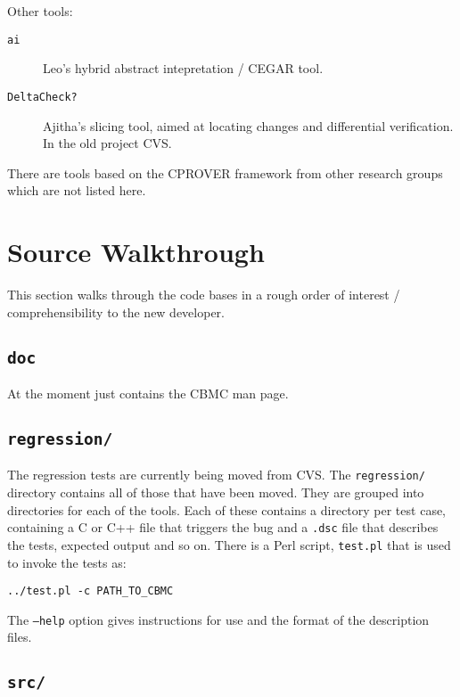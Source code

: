 \documentclass{article}
\newcommand{\dir}[1]{\texttt{#1}}
\newcommand{\file}[1]{\texttt{#1}}
\newcommand{\code}[1]{\texttt{#1}}
\newcommand{\prog}[1]{\texttt{#1}}
\begin{document}
Other tools:

\begin{description}
  \item[\prog{ai}]{Leo's hybrid abstract intepretation / CEGAR tool.}

  \item[\prog{DeltaCheck?}]{Ajitha's slicing tool, aimed at locating
    changes and differential verification.  In the old project CVS.}
\end{description}


There are tools based on the CPROVER framework from other research
groups which are not listed here.






\section{Source Walkthrough}

This section walks through the code bases in a rough order of interest
/ comprehensibility to the new developer.



\subsection{\dir{doc}}

At the moment just contains the CBMC man page.

\subsection{\dir{regression/}}

The regression tests are currently being moved from CVS.  The
\dir{regression/} directory contains all of those that have been
moved.  They are grouped into directories for each of the tools.  Each
of these contains a directory per test case, containing a C or C++
file that triggers the bug and a \file{.dsc} file that describes the
tests, expected output and so on.  There is a Perl script,
\file{test.pl} that is used to invoke the tests as:

\begin{center}
  \code{../test.pl -c PATH\_TO\_CBMC}
\end{center}

The \code{--help} option gives instructions for use and the format of
the description files.



\subsection{\dir{src/}}
\end{document}
